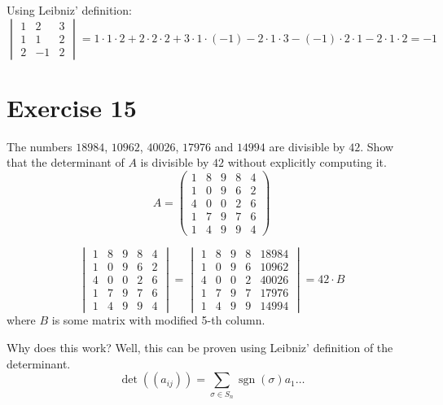 \documentclass[a4paper]{article}
\theoremstyle{definition}
\begin{document}
Using Leibniz' definition:
\[
  \begin{vmatrix}
    1 & 2 & 3 \\
    1 & 1 & 2 \\
    2 & -1 & 2
  \end{vmatrix}
  = 1 \cdot 1 \cdot 2 + 2 \cdot 2 \cdot 2 + 3 \cdot 1 \cdot (-1)
  - 2 \cdot 1 \cdot 3 - (-1) \cdot 2 \cdot 1 - 2 \cdot 1 \cdot 2 = -1
\]

\section{Exercise 15}
\begin{ex}
  The numbers $18984$, $10962$, $40026$, $17976$ and $14994$ are divisible by $42$.
  Show that the determinant of $A$ is divisible by $42$ without explicitly computing it.
  \[
    A = \begin{pmatrix}
      1 & 8 & 9 & 8 & 4 \\
      1 & 0 & 9 & 6 & 2 \\
      4 & 0 & 0 & 2 & 6 \\
      1 & 7 & 9 & 7 & 6 \\
      1 & 4 & 9 & 9 & 4
    \end{pmatrix}
  \]
\end{ex}

\[
  \begin{vmatrix}
    1 & 8 & 9 & 8 & 4 \\
    1 & 0 & 9 & 6 & 2 \\
    4 & 0 & 0 & 2 & 6 \\
    1 & 7 & 9 & 7 & 6 \\
    1 & 4 & 9 & 9 & 4
  \end{vmatrix}
  =
  \begin{vmatrix}
    1 & 8 & 9 & 8 & 18984 \\
    1 & 0 & 9 & 6 & 10962 \\
    4 & 0 & 0 & 2 & 40026 \\
    1 & 7 & 9 & 7 & 17976 \\
    1 & 4 & 9 & 9 & 14994
  \end{vmatrix}
  = 42 \cdot B
\]
where $B$ is some matrix with modified 5-th column.

Why does this work?
Well, this can be proven using Leibniz' definition of the determinant.
\[
  \det((a_{ij}))
  = \sum_{\sigma \in S_n}
    \operatorname{sgn}(\sigma) a_1  \ldots
\]
\end{document}
